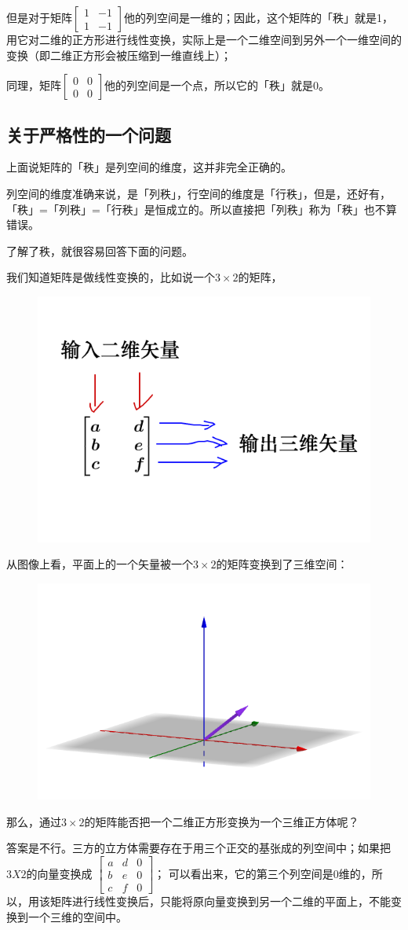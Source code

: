 \documentclass[12pt]{article}
\begin{document}
但是对于矩阵$\begin{bmatrix}1&-1\\1&-1\end{bmatrix}$他的列空间是一维的；因此，这个矩阵的「秩」就是1，用它对二维的正方形进行线性变换，实际上是一个二维空间到另外一个一维空间的变换（即二维正方形会被压缩到一维直线上）；

同理，矩阵$\begin{bmatrix}0&0\\0&0\end{bmatrix}$他的列空间是一个点，所以它的「秩」就是0。

\subsection{关于严格性的一个问题}
上面说矩阵的「秩」是列空间的维度，这并非完全正确的。

列空间的维度准确来说，是「列秩」，行空间的维度是「行秩」，但是，还好有，「秩」=「列秩」=「行秩」是恒成立的。所以直接把「列秩」称为「秩」也不算错误。

\begin{framed}  
\small{
了解了秩，就很容易回答下面的问题。

我们知道矩阵是做线性变换的，比如说一个$3\times2$的矩阵，
\begin{figure}[H]
    \centering
    \includegraphics[width=.3\textwidth]{fig/UnderstandDeterminant_5.png}
\end{figure}  

从图像上看，平面上的一个矢量被一个$3\times2$的矩阵变换到了三维空间：
\begin{figure}[H]
    \centering
    \includegraphics[width=.3\textwidth]{fig/UnderstandDeterminant_6.png}
\end{figure} 

那么，通过$3\times2$的矩阵能否把一个二维正方形变换为一个三维正方体呢？

答案是不行。三方的立方体需要存在于用三个正交的基张成的列空间中；如果把$3X2$的向量变换成 
$\begin{bmatrix}
a&d&0\\b&e&0\\c&f&0
\end{bmatrix}$；
可以看出来，它的第三个列空间是0维的，所以，用该矩阵进行线性变换后，只能将原向量变换到另一个二维的平面上，不能变换到一个三维的空间中。
}
\end{framed}
\end{document}
